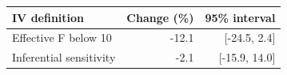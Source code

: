 \begin{tabular}{lrr}
\toprule
IV definition & Change (\%) & 95\% interval \\
\midrule
Effective F below 10 & -12.1 & [-24.5, 2.4] \\
Inferential sensitivity & -2.1 & [-15.9, 14.0] \\
\bottomrule
\end{tabular}
